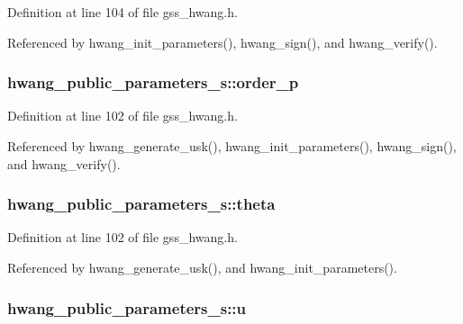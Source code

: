 Definition at line 104 of file gss\-\_\-hwang.\-h.



Referenced by hwang\-\_\-init\-\_\-parameters(), hwang\-\_\-sign(), and hwang\-\_\-verify().

\hypertarget{structhwang__public__parameters__s_adc9f9aff37759616bf17c9fff35f93e1}{
\subsubsection[{order\-\_\-p}]{ hwang\-\_\-public\-\_\-parameters\-\_\-s\-::order\-\_\-p}}\label{structhwang__public__parameters__s_adc9f9aff37759616bf17c9fff35f93e1}


Definition at line 102 of file gss\-\_\-hwang.\-h.



Referenced by hwang\-\_\-generate\-\_\-usk(), hwang\-\_\-init\-\_\-parameters(), hwang\-\_\-sign(), and hwang\-\_\-verify().

\hypertarget{structhwang__public__parameters__s_a14c0356c5e33b65ebe65312196b064f9}{
\subsubsection[{theta}]{ hwang\-\_\-public\-\_\-parameters\-\_\-s\-::theta}}\label{structhwang__public__parameters__s_a14c0356c5e33b65ebe65312196b064f9}


Definition at line 102 of file gss\-\_\-hwang.\-h.



Referenced by hwang\-\_\-generate\-\_\-usk(), and hwang\-\_\-init\-\_\-parameters().

\hypertarget{structhwang__public__parameters__s_a5e333ad9fada9cec12e44147d4a1b562}{
\subsubsection[{u}]{ hwang\-\_\-public\-\_\-parameters\-\_\-s\-::u}}\label{structhwang__public__parameters__s_a5e333ad9fada9cec12e44147d4a1b562}


